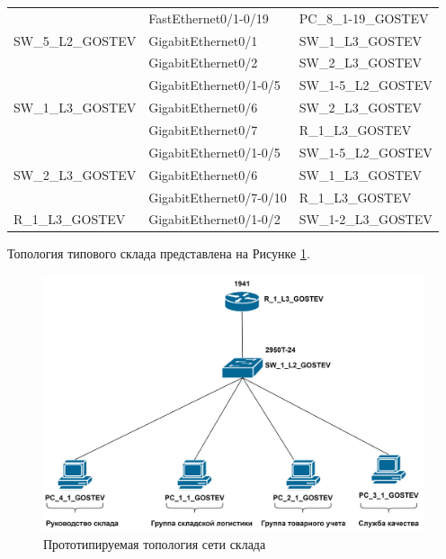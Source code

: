 \documentclass[14pt, a4paper]{extarticle}
\numberwithin{equation}{section}
\begin{document}
\begin{table}[H]
\begin{tabular}{|l|l|l|}
\multirow{3}{*}{SW\_5\_L2\_GOSTEV} & FastEthernet0/1-0/19   & PC\_8\_1-19\_GOSTEV           \\ \cline{2-3} 
                                   & GigabitEthernet0/1     & SW\_1\_L3\_GOSTEV             \\ \cline{2-3} 
                                   & GigabitEthernet0/2     & SW\_2\_L3\_GOSTEV             \\ \hline
\multirow{3}{*}{SW\_1\_L3\_GOSTEV} & GigabitEthernet0/1-0/5 & SW\_1-5\_L2\_GOSTEV           \\ \cline{2-3} 
                                   & GigabitEthernet0/6     & SW\_2\_L3\_GOSTEV             \\ \cline{2-3} 
                                   & GigabitEthernet0/7     & R\_1\_L3\_GOSTEV              \\ \hline
\multirow{3}{*}{SW\_2\_L3\_GOSTEV} & GigabitEthernet0/1-0/5 & SW\_1-5\_L2\_GOSTEV           \\ \cline{2-3} 
                                   & GigabitEthernet0/6     & SW\_1\_L3\_GOSTEV             \\ \cline{2-3} 
                                   & GigabitEthernet0/7-0/10     & R\_1\_L3\_GOSTEV              \\ \hline
R\_1\_L3\_GOSTEV                   & GigabitEthernet0/1-0/2 & SW\_1-2\_L3\_GOSTEV           \\ \hline
\end{tabular}
\end{table}



Топология типового склада представлена на Рисунке \ref{fig:warehouseTopo}.
\begin{figure}[H]
        \centering
        \includegraphics[scale=0.2]{topo_warehouse.png}
        \caption{Прототипируемая топология сети склада}
        \label{fig:warehouseTopo}
\end{figure}
\end{document}
